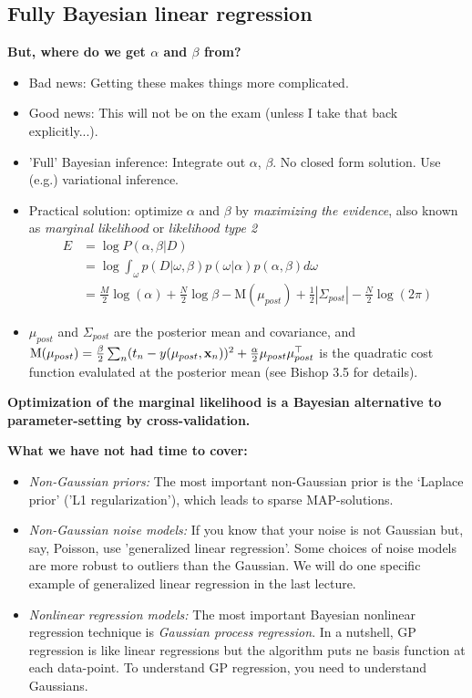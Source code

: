 \subsection{Fully Bayesian linear regression}


\textbf{But, where do we get $\alpha$ and $\beta$ from?}

\begin{itemize}
\item Bad news: Getting these makes things more complicated.
\item  Good news: This will not be on the exam (unless I take that back explicitly...). 
\item  'Full' Bayesian inference: Integrate out $\alpha$, $\beta$. No closed form solution. Use (e.g.) variational inference.
\item  Practical solution: optimize $\alpha$ and $\beta$ by \emph{maximizing the evidence}, also known as \emph{marginal likelihood} or \emph{likelihood type 2}
\begin{align}
E&=\log P(\alpha, \beta|D)\\
&= \log \int_\omega p(D|\omega,\beta) p(\omega|\alpha) p(\alpha,\beta)    d \omega\\
&= \frac{M}{2}\log(\alpha)+\frac{N}{2}\log \beta-\mbox{M}(\mu_{post})+\frac{1}{2}|\Sigma_{post}|-\frac{N}{2} \log(2\pi) 
\end{align}
\item $\mu_{post}$ and $\Sigma_{post}$ are the posterior mean and covariance, and $\mbox{M}(\mu_{post})=\frac{\beta}{2}\sum_n (t_n-y(\mu_{post},{\mathbf{x}}_n))^2+\frac{\alpha}{2} \mu_{post}\mu_{post}^\top$ is the quadratic cost function evalulated at the posterior mean (see Bishop 3.5 for details).
\end{itemize}


\textbf{Optimization of the marginal likelihood is a Bayesian alternative to parameter-setting by cross-validation.}

\textbf{What we have not had time to cover:}
\begin{itemize}
\item \emph{Non-Gaussian priors:} The most important non-Gaussian prior is the `Laplace prior' ('L1 regularization'), which leads to sparse MAP-solutions.
\item \emph{Non-Gaussian noise models:} If you know that your noise is not Gaussian but, say, Poisson, use 'generalized linear regression'. Some choices of noise models are more robust to outliers than the Gaussian. We will do one specific example of generalized linear regression in the last lecture.
\item \emph{Nonlinear regression models:} The most important Bayesian nonlinear regression technique is \emph{Gaussian process regression}. In a nutshell, GP regression is like linear regressions but the algorithm puts ne basis function at each data-point. To understand GP regression, you need to understand Gaussians.
\end{itemize}


